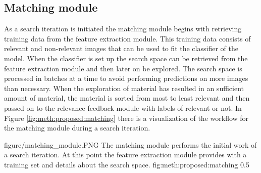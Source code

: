 \subsection{Matching module}
\label{sec:meth:proposed:matching}
As a search iteration is initiated the matching module begins with retrieving training data from the feature extraction module. This training data consists of relevant and non-relevant images that can be used to fit the classifier of the model. When the classifier is set up the search space can be retrieved from the feature extraction module and then later on be explored. The search space is processed in batches at a time to avoid performing predictions on more images than necessary. When the exploration of material has resulted in an sufficient amount of material, the material is sorted from most to least relevant and then passed on to the relevance feedback module with labels of relevant or not. 
In Figure \ref{fig:meth:proposed:matching} there is a visualization of the workflow for the matching module during a search iteration. 

\singlefigure
{figure/matching_module.PNG}
{The matching module performs the initial work of a search iteration. At this point the feature extraction module provides with a training set and details about the search space.}
{fig:meth:proposed:matching}
{0.5}




